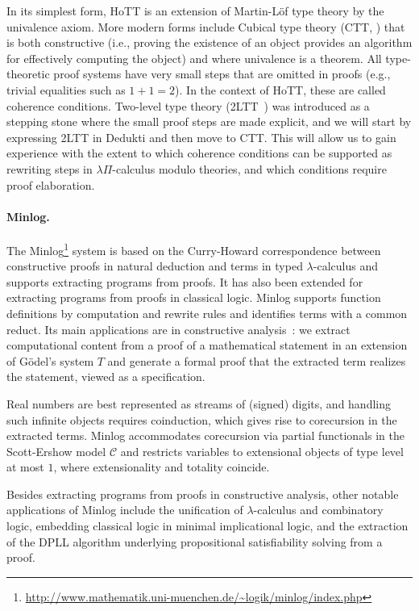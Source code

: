 In its simplest form, HoTT is an extension of Martin-L\"of type theory by the
univalence axiom. More modern forms include Cubical type theory (CTT,
\cite{cohen:cubical}) that is both constructive (i.e., proving the existence of
an object provides an algorithm for effectively computing the object) and where
univalence is a theorem. All type-theoretic proof systems have very small steps
that are omitted in proofs (e.g., trivial equalities such as $1+1=2$). In the
context of HoTT, these are called coherence conditions. Two-level type theory
(2LTT~\cite{annenkov:two-level}) was introduced as a stepping stone where the
small proof steps are made explicit, and we will start by expressing 2LTT in
Dedukti and then move to CTT. This will allow us to gain experience with
the extent to which coherence conditions can be supported as rewriting steps in
$\lambda\Pi$-calculus modulo theories, and which conditions require proof
elaboration.

\paragraph*{Minlog.}

The
Minlog\footnote{\url{http://www.mathematik.uni-muenchen.de/~logik/minlog/index.php}}
system is based on the Curry-Howard correspondence between constructive proofs
in natural deduction and terms in typed $\lambda$-calculus and supports
extracting programs from proofs. It has also been extended for extracting
programs from proofs in classical logic. Minlog supports function definitions by
computation and rewrite rules and identifies terms with a common reduct. Its
main applications are in constructive analysis~\cite{miyamoto:real}: we extract
computational content from a proof of a mathematical statement in an extension
of Gödel's system $T$ and generate a formal proof that the extracted term
realizes the statement, viewed as a specification.

Real numbers are best represented as streams of (signed) digits, and handling
such infinite objects requires coinduction, which gives rise to corecursion in
the extracted terms. Minlog accommodates corecursion via partial functionals in
the Scott-Ershow model $\mathcal{C}$ and restricts variables to extensional
objects of type level at most $1$, where extensionality and totality coincide.

Besides extracting programs from proofs in constructive analysis, other notable
applications of Minlog include the unification of $\lambda$-calculus and
combinatory logic, embedding classical logic in minimal implicational logic, and
the extraction of the DPLL algorithm underlying propositional satisfiability
solving from a proof.

